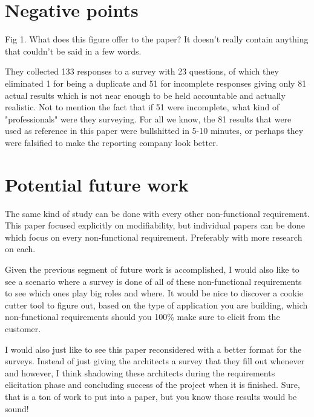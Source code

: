 \documentclass[11pt,twoside]{IEEEtran}
\begin{document}
\section{Negative points}
Fig 1. What does this figure offer to the paper? It doesn't really contain anything that couldn't be said in a few words.

They collected 133 responses to a survey with 23 questions, of which they eliminated 1 for being a duplicate and 51 for incomplete responses giving only 81 actual results which is not near enough to be held accountable and actually realistic. Not to mention the fact that if 51 were incomplete, what kind of "professionals" were they surveying. For all we know, the 81 results that were used as reference in this paper were bullshitted in 5-10 minutes, or perhaps they were falsified to make the reporting company look better.

\section{Potential future work}
The same kind of study can be done with every other non-functional requirement. This paper focused explicitly on modifiability, but individual papers can be done which focus on every non-functional requirement. Preferably with more research on each.

Given the previous segment of future work is accomplished, I would also like to see a scenario where a survey is done of all of these non-functional requirements to see which ones play big roles and where. It would be nice to discover a cookie cutter tool to figure out, based on the type of application you are building, which non-functional requirements should you 100\% make sure to elicit from the customer.

I would also just like to see this paper reconsidered with a better format for the surveys. Instead of just giving the architects a survey that they fill out whenever and however, I think shadowing these architects during the requirements elicitation phase and concluding success of the project when it is finished. Sure, that is a ton of work to put into a paper, but you know those results would be sound!
\end{document}
